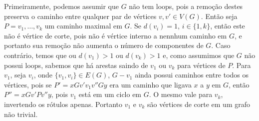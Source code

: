 
Primeiramente, podemos assumir que $G$ não tem loops, pois a remoção destes 
preserva o caminho entre qualquer par de vértices $v,v' \in V(G)$. Então seja 
$P = v_1,\ldots ,v_k$ um caminho maximal em $G$. Se $d(v_i) = 1$, $i \in \{1,k\}$, 
então este não é vértice de corte, pois não é vértice interno a nennhum caminho 
em $G$, e portanto sua remoção não aumenta o número de componentes de $G$. 
Caso contrário, temos que ou $d(v_1) > 1$ ou $d(v_k) > 1$ e, como assumimos que
$G$ não possui loops, sabemos que há arestas saindo de $v_1$ ou $v_k$ para
vértices de $P$. Para $v_1$, seja $v_i$, onde $\{v_1,v_i\} \in E(G)$, $G - v_1$
ainda possui caminhos entre todos os vértices, pois se $P' = xGv'v_1v''Gy$ era um 
caminho que ligava $x$ a $y$ em $G$, então $P'' = xGv'Pv''y$, pois $v_1$ está 
em um ciclo em $G$. O mesmo vale para $v_k$, invertendo os rótulos apenas.
Portanto $v_1$ e $v_k$ são vértices de corte em um grafo não trivial.
\fimprova

